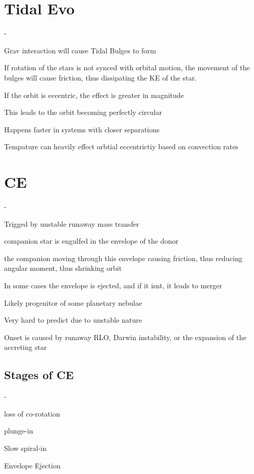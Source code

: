 \section{Tidal Evo}
\begin{list}{-}{}
\item Grav interaction will cause Tidal Bulges to form
\item If rotation of the stars is not synced with orbital motion, the movement of the bulges will cause friction, thus dissipating the KE of the star.
\item If the orbit is eccentric, the effect is greater in magnitude
\item This leads to the orbit becoming perfectly circular 
\item Happens faster in systems with closer separations
\item Tempature can heavily effect orbtial eccentrictiy based on convection rates
\end{list}

\section{CE}
\begin{list}{-}{}
\item Trigged by unstable runaway mass transfer
\item companion star is engulfed in the envelope of the donor
\item the companion moving through this envelope causing friction, thus reducing angular moment, thus shrinking orbit
\item In some cases the envelope is ejected, and if it isnt, it leads to merger
\item Likely progenitor of some planetary nebulae 
\item Very hard to predict due to unstable nature
\item Onset is caused by runaway RLO, Darwin instability, or the expansion of the accreting star
\end{list}

\subsection{Stages of CE}
\begin{list}{-}{}
\item loss of co-rotation
\item plunge-in
\item Slow spiral-in
\item Envelope Ejection
\end{list}


